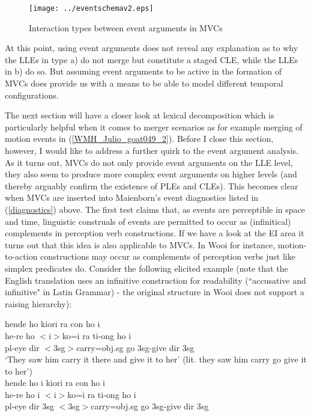 \begin{figure}

\texttt{[image: ../eventschemav2.eps]} 
\caption{Interaction types between event arguments in MVCs}\label{fig:events}

\end{figure}


At this point, using event arguments does not reveal any explanation as to why the LLEs in type a) do not merge but constitute a staged CLE, while the LLEs in b) do so. But assuming event arguments to be active in the formation of MVCs does provide us with a means to be able to model different temporal configurations.

The next section will have a closer look at lexical decomposition which is particularly helpful when it comes to  merger scenarios as for example merging of motion events in (\ref{WMH_Julio_goat049_2}). Before I close this section, however, I would like to address a further quirk to the event argument analysis. As it turns out, MVCs do not only provide event arguments on the LLE level, they also seem to produce more complex event arguments on higher levels (and thereby arguably confirm the existence of PLEs and CLEs). This becomes clear when MVCs are inserted into Maienborn's event diagnostics listed in (\ref{diagnostics}) above. The first test claims that, as events are perceptible in space and time, linguistic construals of events are permitted to occur as (infinitical) complements in perception verb constructions. If we have a look at the EI area it turns out that this idea is also applicable to MVCs. In Wooi for instance, motion-to-action constructions may occur as complements of perception verbs just like simplex predicates do. Consider the following elicited example (note that the English translation uses an infinitive construction for readability (``accusative and infinitive" in Latin Grammar) - the original structure in Wooi does not support a raising hierarchy):

\pex \label{hendeho}
\ea
\gll hende ho kiori ra con ho i \\
he-re ho $<$i$>$ko=i ra ti-ong ho i \\
\acs{pl}-eye \acs{dir} $<$3\acs{sg}$>$carry=\acs{obj}.\acs{sg} go 3\acs{sg}-give \acs{dir} 3\acs{sg}\\
\glft `They saw him carry it there and give it to her' (lit. they saw him carry go give it to her')\\
\z
\ea
\gll *hende ho i kiori ra con ho i\\
he-re ho i $<$i$>$ko=i ra ti-ong ho i \\
\acs{pl}-eye \acs{dir} 3\acs{sg} $<$3\acs{sg}$>$carry=\acs{obj}.\acs{sg} go 3\acs{sg}-give \acs{dir} 3\acs{sg}\\
\glft  {}\ 
\z
\xe

